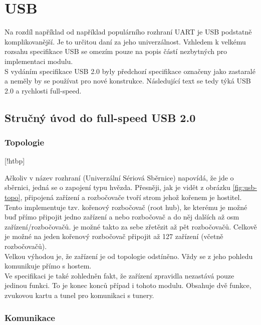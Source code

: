 \section{USB}
\label{sec:USB}
Na rozdíl například od například populárního rozhraní UART je USB podstatně komplikovanější. Je to určitou daní za jeho univerzálnost. Vzhledem k velkému rozsahu specifikace USB \cite{usb} se omezím pouze na popis částí nezbytných pro implementaci modulu.\\
S vydáním specifikace USB 2.0 byly předchozí specifikace označeny jako zastaralé a neměly by se používat pro nové konstrukce. Následující text se tedy týká USB 2.0 a rychlosti full-speed.



\subsection{Stručný úvod do full-speed USB 2.0}
\subsubsection{Topologie}
[!htbp]

Ačkoliv v název rozhraní (Univerzální Sériová Sběrnice) napovídá, že jde o sběrnici, jedná se o zapojení typu hvězda. Přesněji, jak je vidět z obrázku \ref{fig:usb-topo}, připojená zařízení a rozbočovače tvoří strom jehož kořenem je hostitel. Tento implementuje tzv. kořenový rozbočovač (root hub), ke kterému je možné buď přímo připojit jedno zařízení a nebo rozbočovač a do něj dalších až osm zařízení/rozbočovačů. je možné takto za sebe zřetězit až pět rozbočovačů. Celkově je možné na jeden kořenový rozbočovač připojit až 127 zařízení (včetně rozbočovačů).\\
Velkou výhodou je, že zařízení je od topologie odstíněno. Vždy se z jeho pohledu komunikuje přímo s hostem.\\
Ve specifikaci je také zohledněn fakt, že zařízení zpravidla nezastává pouze jedinou funkci. To je konec konců případ i tohoto modulu. Obsahuje dvě funkce, zvukovou kartu a \iic tunel pro komunikaci s tunery.

\subsubsection{Komunikace}


